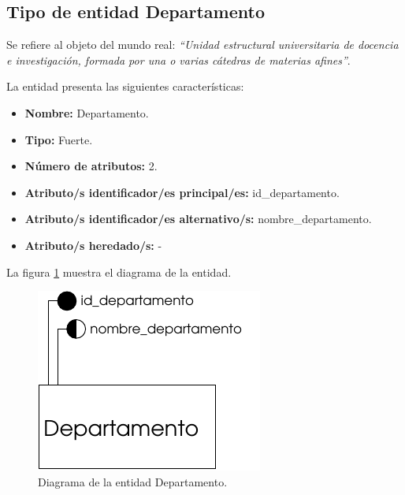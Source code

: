 \subsection{Tipo de entidad Departamento}

   \begin{description}

   \item[Definición] Se refiere al objeto del mundo real: \emph{``Unidad
   estructural universitaria de docencia e investigación, formada por una o
   varias cátedras de materias afines''}.

   \item[Características] La entidad presenta las siguientes características:
      \begin{itemize}
         \item \textbf{Nombre:} Departamento.
         \item \textbf{Tipo:} Fuerte.
         \item \textbf{Número de atributos:} 2.
         \item \textbf{Atributo/s identificador/es principal/es:} id\_departamento.
         \item \textbf{Atributo/s identificador/es alternativo/s:} nombre\_departamento.
         \item \textbf{Atributo/s heredado/s:} -
      \end{itemize}

   \item[Diagrama] La figura \ref{diagramaDepartamento} muestra el diagrama de la entidad.
   \item \begin{figure}[!ht]
            \begin{center}
            \includegraphics[]{07.Modelo_Entidad-Interrelacion/7.2.Analisis_Entidades/diagramas/departamento.pdf}
            \caption{Diagrama de la entidad Departamento.}
            \label{diagramaDepartamento}
            \end{center}
         \end{figure}


\end{description}
